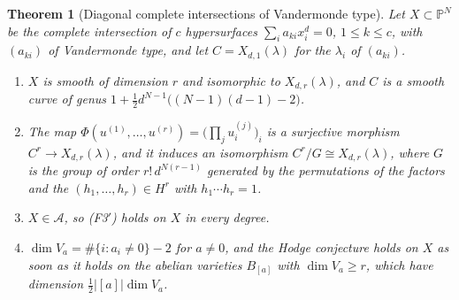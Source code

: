 \documentclass[11pt,reqno]{amsart}
\theoremstyle{plain}
\newtheorem{theorem}{Theorem}[section]
\theoremstyle{definition}
\theoremstyle{remark}
\newcommand{\PP}{\mathbb{P}}
\begin{document}
\begin{theorem}[Diagonal complete intersections of Vandermonde
type]\label{thm:vandermonde}
Let $X\subset\PP^{N}$ be the complete intersection of $c$ hypersurfaces
$\sum_{i}a_{ki}x_{i}^{d}=0$, $1\le k\le c$, with $(a_{ki})$ of Vandermonde
type, and let $C=X_{d,1}(\lambda)$ for the $\lambda_{i}$ of $(a_{ki})$.
\begin{enumerate}[label=\textup{(\roman*)},leftmargin=2.6em,itemsep=2pt]
\item $X$ is smooth of dimension $r$ and isomorphic to $X_{d,r}(\lambda)$,
  and $C$ is a smooth curve of genus
  $1+\tfrac12d^{N-1}\bigl((N-1)(d-1)-2\bigr)$.
\item The map
  $\Phi(u^{(1)},\dots,u^{(r)})=\bigl(\prod_{j}u^{(j)}_{i}\bigr)_{i}$ is a
  surjective morphism $C^{r}\to X_{d,r}(\lambda)$, and it induces an
  isomorphism $C^{r}/G\cong X_{d,r}(\lambda)$, where $G$ is the group of
  order $r!\,d^{N(r-1)}$ generated by the permutations of the factors and the
  $(h_{1},\dots,h_{r})\in H^{r}$ with $h_{1}\cdots h_{r}=1$.
\item $X\in\mathcal{A}$, so \textup{(F3$'$)} holds on $X$ in every degree.
\item $\dim V_{a}=\#\{i:a_{i}\ne0\}-2$ for $a\ne0$, and the Hodge conjecture
  holds on $X$ as soon as it holds on the abelian varieties $B_{[a]}$ with
  $\dim V_{a}\ge r$, which have dimension $\tfrac12|[a]|\dim V_{a}$.
\end{enumerate}
\end{theorem}
\end{document}
